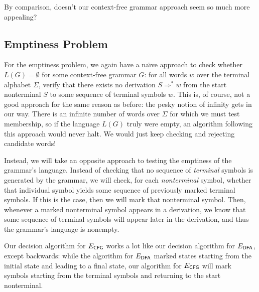 By comparison, doesn't our context-free grammar approach seem so much more appealing?

\subsection*{Emptiness Problem}

For the emptiness problem, we again have a na\"{\i}ve approach to check whether $L(G) = \emptyset$ for some context-free grammar $G$: for all words $w$ over the terminal alphabet $\Sigma$, verify that there exists no derivation $S \Rightarrow^{*} w$ from the start nonterminal $S$ to some sequence of terminal symbols $w$. This is, of course, not a good approach for the same reason as before: the pesky notion of infinity gets in our way. There is an infinite number of words over $\Sigma$ for which we must test membership, so if the language $L(G)$ truly were empty, an algorithm following this approach would never halt. We would just keep checking and rejecting candidate words!

Instead, we will take an opposite approach to testing the emptiness of the grammar's language. Instead of checking that no sequence of \emph{terminal} symbols is generated by the grammar, we will check, for each \emph{nonterminal} symbol, whether that individual symbol yields some sequence of previously marked terminal symbols. If this is the case, then we will mark that nonterminal symbol. Then, whenever a marked nonterminal symbol appears in a derivation, we know that some sequence of terminal symbols will appear later in the derivation, and thus the grammar's language is nonempty.

Our decision algorithm for $E_{\textsf{CFG}}$ works a lot like our decision algorithm for $E_{\textsf{DFA}}$, except backwards: while the algorithm for $E_{\textsf{DFA}}$ marked states starting from the initial state and leading to a final state, our algorithm for $E_{\textsf{CFG}}$ will mark symbols starting from the terminal symbols and returning to the start nonterminal.

